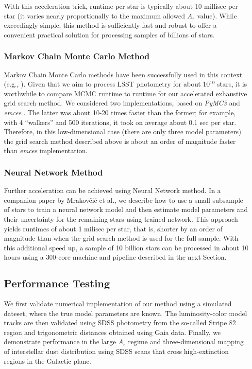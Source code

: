 With this acceleration trick, runtime per star is typically about 10 millisec per star  (it varies nearly proportionally to the maximum allowed $A_r$ value). 
While exceedingly simple, this method is sufficiently fast and robust to offer a convenient practical solution for processing samples of billions of stars. 


\subsubsection{Markov Chain Monte Carlo Method}
 
Markov Chain Monte Carlo methods have been successfully used in this context (e.g., \citealt{2014ApJ...783..114G}). 
Given that we aim to process LSST photometry for about 10$^{10}$ stars, it is worthwhile to compare MCMC runtime
to runtime for our accelerated exhaustive grid search method. We considered two implementations, based on {\it PyMC3} \citep{pymc2023} and
{\it emcee} \citep{2013PASP..125..306F}. The latter was about 10-20 times faster than the former; for example, with 4 ``walkers'' and 500
iterations, it took on average about 0.1 sec per star. Therefore, in this low-dimensional case (there are only three model parameters) the
grid search method described above is about an order of magnitude faster than {\it emcee} implementation. 


\subsubsection{Neural Network Method}

Further acceleration can be achieved using Neural Network method. In a companion paper by Mrakov\v{c}i\'{c} et al., we describe
how to use a small subsample of stars to train a neural network model and then estimate model parameters and their uncertainty for the remaining
stars using trained network. This approach yields runtimes of about 1 milisec per star, that is, shorter by an order of magnitude than when
the grid search method is used for the full sample. With this additional speed up, a sample of 10 billion stars can be processed in
about 10 hours using a 300-core machine and pipeline described in the next Section. 


\subsection{Performance Testing} 

We first validate numerical implementation of our method using a simulated dateset, where the true model parameters are known.
The luminosity-color model tracks are then validated using SDSS photometry from the so-called Stripe 82 region and trigonometric
distances obtained using Gaia data. Finally, we demonstrate
performance in the large $A_r$ regime and three-dimensional mapping of interstellar dust distribution using SDSS
scans that cross high-extinction regions in the Galactic plane.
 

